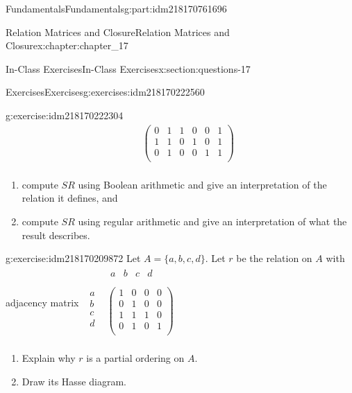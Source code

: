 \documentclass[oneside,10pt,]{book}
\numberwithin{equation}{section}
\begin{document}
\begin{partptx}{Fundamentals}{}{Fundamentals}{}{}{g:part:idm218170761696}
\begin{chapterptx}{Relation Matrices and Closure}{}{Relation Matrices and Closure}{}{}{x:chapter:chapter_17}
\begin{sectionptx}{In-Class Exercises}{}{In-Class Exercises}{}{}{x:section:questions-17}
\begin{exercises-subsection-numberless}{Exercises}{}{Exercises}{}{}{g:exercises:idm218170222560}
\begin{exercisegroup}
\begin{divisionexerciseeg}{1}{}{}{g:exercise:idm218170222304}
\begin{equation*}
\begin{array}{cc}
\begin{array}{c}
\end{array}
& \left(
\begin{array}{cccccc}
0 & 1 & 1 & 0 & 0 & 1 \\
1 & 1 & 0 & 1 & 0 & 1 \\
0 & 1 & 0 & 0 & 1 & 1 \\
\end{array}
\right) \\
\end{array}
\end{equation*}
%
\par
%
\begin{enumerate}[label=(\alph*)]
\item{}compute \(S R\) using Boolean arithmetic and give an interpretation of the relation it defines, and%
\item{}compute \(S R\) using regular arithmetic and give an interpretation of what the result describes.%
\end{enumerate}
%
\end{divisionexerciseeg}%
\begin{divisionexerciseeg}{2}{}{}{g:exercise:idm218170209872}%
Let \(A = \{a, b, c, d\}\).  Let \(r\) be the relation on \(A\) with adjacency matrix \(\begin{array}{cc}
& 
\begin{array}{cccc}
a & b & c & d \\
\end{array}
\\
\begin{array}{c}
a \\
b \\
c \\
d \\
\end{array}
& \left(
\begin{array}{cccc}
1 & 0 & 0 & 0 \\
0 & 1 & 0 & 0 \\
1 & 1 & 1 & 0 \\
0 & 1 & 0 & 1 \\
\end{array}
\right) \\
\end{array}\)%
\par
%
\begin{enumerate}[label=(\alph*)]
\item{}Explain why \(r\) is a partial ordering on \(A\).%
\item{}Draw its Hasse diagram.%
\end{enumerate}

\end{divisionexerciseeg}
\end{exercisegroup}
\end{exercises-subsection-numberless}
\end{sectionptx}
\end{chapterptx}
\end{partptx}
\end{document}
